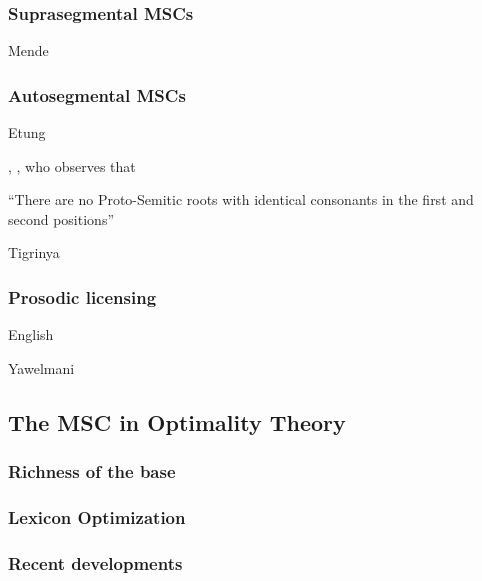\subsubsection{Suprasegmental MSCs}

Mende
\citet{Leben1973}

\subsubsection{Autosegmental MSCs}

Etung
\citet{Edmondson1966}
\citet[][132]{Goldsmith1976}

\citet{McCarthy1979}
\citet{McCarthy1981b}
\citet{McCarthy1986}

\citet{Greenberg1950},
\citet[][178]{Greenberg1950}, who observes that 

``There are no Proto-Semitic roots with identical consonants in the first and second positions''

Tigrinya
\citet{Berhane1991}
\citet{Buckley1990a}
\citet{Buckley1997}
\citet{Buckley2000c}

\subsubsection{Prosodic licensing}

\citet{Ito1989}

English
\citet{McCarthy1979}
\citet[][63, 73]{Kiparsky1982b}
\citet[][19f.]{Wolf2009}

Yawelmani
\citet{Kuroda1967}
\citet{Kisseberth1969}
\citet{Kisseberth1970}

\subsection{The MSC in Optimality Theory}

\subsubsection{Richness of the base}

\subsubsection{Lexicon Optimization}

\subsubsection{Recent developments}

